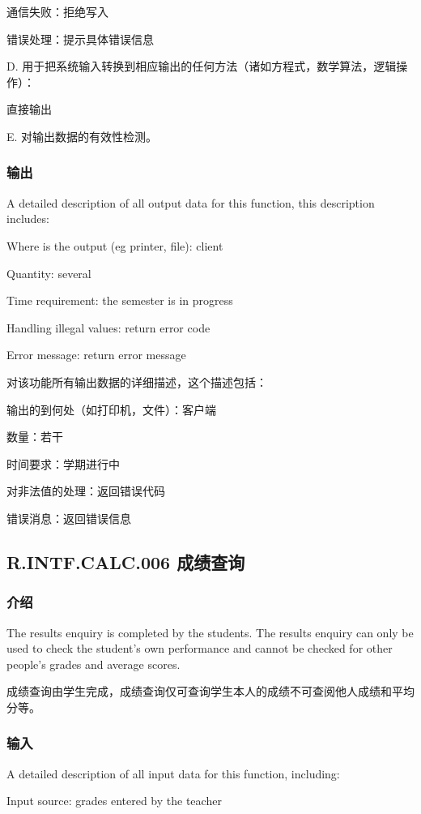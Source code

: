 	通信失败：拒绝写入
	
	错误处理：提示具体错误信息

D. 用于把系统输入转换到相应输出的任何方法（诸如方程式，数学算法，逻辑操作）：
	
	直接输出
		
E.	对输出数据的有效性检测。
\subsubsection{输出}
A detailed description of all output data for this function, this description includes:

Where is the output (eg printer, file): client

Quantity: several

Time requirement: the semester is in progress

Handling illegal values: return error code

Error message: return error message

对该功能所有输出数据的详细描述，这个描述包括：

	输出的到何处（如打印机，文件）：客户端

	数量：若干

	时间要求：学期进行中

	对非法值的处理：返回错误代码

	错误消息：返回错误信息
		
\subsection{R.INTF.CALC.006 成绩查询}
\subsubsection{介绍}

The results enquiry is completed by the students. The results enquiry can only be used to check the student's own performance and cannot be checked for other people's grades and average scores.

成绩查询由学生完成，成绩查询仅可查询学生本人的成绩不可查阅他人成绩和平均分等。

\subsubsection{输入}
A detailed description of all input data for this function, including:

Input source: grades entered by the teacher

